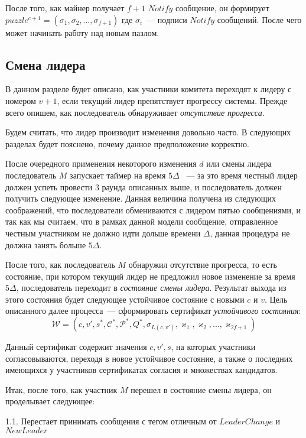 После того, как майнер получает $f+1$ $Notify$ сообщение, он формирует
$puzzle^{c+1}=(\sigma_1, \sigma_2,..., \sigma_{f+1})$
где $\sigma_i$~--- подписи $Notify$ сообщений. После чего может начинать работу над новым пазлом.

\subsection{Смена лидера} \label{leader-change}
В данном разделе будет описано, как участники комитета переходят к лидеру с номером $v+1$, если текущий лидер препятствует прогрессу системы. Прежде всего опишем, как последователь обнаруживает \textit{отсутствие прогресса}.

Будем считать, что лидер производит изменения довольно часто. В следующих разделах будет пояснено, почему данное предположение корректно.

После очередного применения некоторого изменения $d$ или смены лидера последователь $M$ запускает таймер на время $5\Delta$ ~--- за это время честный лидер должен успеть провести 3 раунда описанных выше, и последователь должен получить следующее изменение.
Данная величина получена из следующих соображений, что последователи обмениваются с лидером пятью сообщениями, и так как мы считаем, что в рамках данной модели сообщение, отправленное честным участником не должно идти дольше времени $\Delta$, данная процедура не должна занять больше $5\Delta$.

После того, как последователь $M$ обнаружил отсутствие прогресса, то есть состояние, при котором текущий лидер не предложил новое изменение за время $5\Delta$, последователь переходит в \textit{состояние смены лидера}.
Результат выхода из этого состояния будет следующее устойчивое состояние с новыми $c$ и $v$.
Цель описанного далее процесса~--- сформировать сертификат \textit{устойчивого состояния}:
$$\mathcal{W}=(c, v', s^{*}, \mathcal{C}^{*}, \mathcal{P}^{*}, Q^{*}, \sigma_{L(c, v')}, \varkappa_1, \varkappa_2,..., \varkappa_{2f+1})$$

Данный сертификат содержит значения $c, v', s$, на которых участники согласовываются, переходя в новое устойчивое состояние, а также о последних имеющихся у участников сертификатах согласия и множествах кандидатов.

Итак, после того, как участник $M$ перешел в состояние смены лидера, он проделывает следующее:

1.1. Перестает принимать сообщения с тегом отличным от $LeaderChange$ и $NewLeader$

